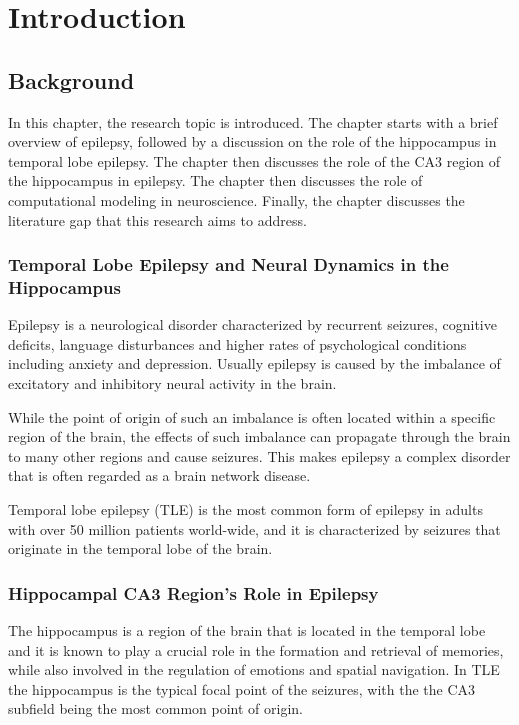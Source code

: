 \chapter{Introduction}


\section{Background}
In this chapter, the research topic is introduced. 
The chapter starts with a brief overview of epilepsy, followed by a discussion on the role of the hippocampus in temporal lobe epilepsy. 
The chapter then discusses the role of the CA3 region of the hippocampus in epilepsy. 
The chapter then discusses the role of computational modeling in neuroscience. 
Finally, the chapter discusses the literature gap that this research aims to address.

\subsection{Temporal Lobe Epilepsy and Neural Dynamics in the Hippocampus}
Epilepsy is a neurological disorder characterized by recurrent seizures, cognitive deficits, language disturbances and higher rates of psychological conditions including anxiety and depression.
Usually epilepsy is caused by the imbalance of excitatory and inhibitory neural activity in the brain.

While the point of origin of such an imbalance is often located within a specific region of the brain,
the effects of such imbalance can propagate through the brain to many other regions and cause seizures.
This makes epilepsy a complex disorder that is often regarded as a brain network disease.

Temporal lobe epilepsy (TLE) is the most common form of epilepsy in adults with over 50 million patients world-wide, and it is characterized by seizures that originate in the temporal lobe of the brain.

\subsection{Hippocampal CA3 Region's Role in Epilepsy}
The hippocampus is a region of the brain that is located in the temporal lobe and it is known to play a crucial role in the formation and retrieval of memories, while also involved in the regulation of emotions and spatial navigation.
In TLE the hippocampus is the typical focal point of the seizures, with the the CA3 subfield being the most common point of origin.

